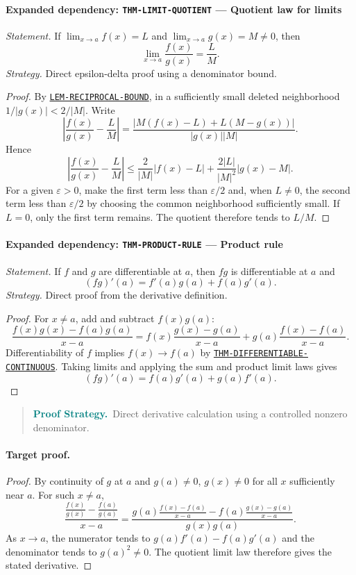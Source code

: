 \documentclass[10pt]{article}
\newcommand{\pidraw}[1]{\begingroup\urlstyle{tt}\nolinkurl{#1}\endgroup}
\newcommand{\pidref}[1]{\hyperref[prf:#1]{\pidraw{#1}}}
\newcommand{\pid}[1]{\pidref{#1}}
\theoremstyle{definition}
\theoremstyle{remark}
\newenvironment{proofstrategy}
{\begin{quote}\small\noindent\textbf{\textcolor{teal}{Proof Strategy.}}\ }
{\end{quote}}
\begin{document}
\paragraph{Expanded dependency: \pidraw{THM-LIMIT-QUOTIENT} --- Quotient law for limits}
\textit{Statement.} If $\lim_{x\to a}f(x)=L$ and $\lim_{x\to a}g(x)=M\ne0$, then
\[
\lim_{x\to a}\frac{f(x)}{g(x)}=\frac{L}{M}.
\]
\textit{Strategy.} Direct epsilon-delta proof using a denominator bound.
\begin{proof}By \pid{LEM-RECIPROCAL-BOUND}, in a sufficiently small deleted neighborhood
$1/|g(x)|<2/|M|$. Write
\[
\left|\frac{f(x)}{g(x)}-\frac{L}{M}\right|
=
\frac{|M(f(x)-L)+L(M-g(x))|}{|g(x)||M|}.
\]
Hence
\[
\left|\frac{f(x)}{g(x)}-\frac{L}{M}\right|
\le
\frac{2}{|M|}|f(x)-L|
+\frac{2|L|}{|M|^2}|g(x)-M|.
\]
For a given $\varepsilon>0$, make the first term less than $\varepsilon/2$
and, when $L\ne0$, the second term less than $\varepsilon/2$ by choosing the
common neighborhood sufficiently small. If $L=0$, only the first term remains.
The quotient therefore tends to $L/M$.\end{proof}

\paragraph{Expanded dependency: \pidraw{THM-PRODUCT-RULE} --- Product rule}
\textit{Statement.} If $f$ and $g$ are differentiable at $a$, then $fg$ is differentiable at $a$ and
\[
(fg)'(a)=f'(a)g(a)+f(a)g'(a).
\]
\textit{Strategy.} Direct proof from the derivative definition.
\begin{proof}For $x\ne a$, add and subtract $f(x)g(a)$:
\[
\frac{f(x)g(x)-f(a)g(a)}{x-a}
=
f(x)\frac{g(x)-g(a)}{x-a}
+
g(a)\frac{f(x)-f(a)}{x-a}.
\]
Differentiability of $f$ implies $f(x)\to f(a)$ by
\pid{THM-DIFFERENTIABLE-CONTINUOUS}. Taking limits and applying the sum and
product limit laws gives
\[
(fg)'(a)=f(a)g'(a)+g(a)f'(a).
\]\end{proof}

\begin{proofstrategy}Direct derivative calculation using a controlled nonzero denominator.\end{proofstrategy}

\paragraph{Target proof.}

\begin{proof}

By continuity of $g$ at $a$ and $g(a)\ne0$, $g(x)\ne0$ for all $x$ sufficiently
near $a$. For such $x\ne a$,
\[
\frac{\frac{f(x)}{g(x)}-\frac{f(a)}{g(a)}}{x-a}
=
\frac{g(a)\frac{f(x)-f(a)}{x-a}
      -f(a)\frac{g(x)-g(a)}{x-a}}
     {g(x)g(a)}.
\]
As $x\to a$, the numerator tends to
$g(a)f'(a)-f(a)g'(a)$ and the denominator tends to $g(a)^2\ne0$.
The quotient limit law therefore gives the stated derivative.

\end{proof}
\end{document}
